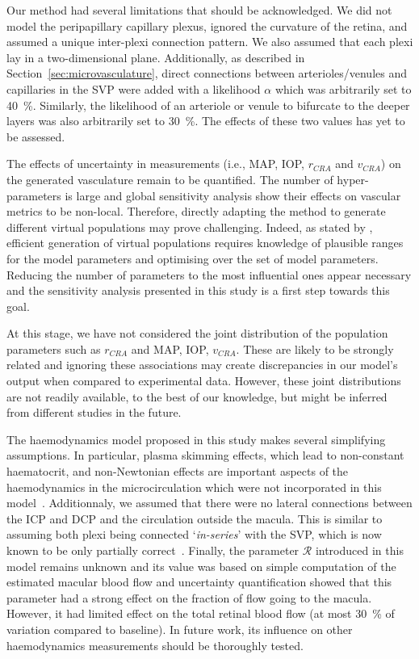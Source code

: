 \documentclass[11pt,]{article}
\begin{document}
Our method had several limitations that should be acknowledged.
We did not model the peripapillary capillary plexus, ignored the curvature of the retina, and assumed a unique inter-plexi connection pattern.
We also assumed that each plexi lay in a two-dimensional plane.
Additionally, as described in Section~\ref{sec:microvasculature}, direct connections between arterioles/venules and capillaries in the SVP were added with a likelihood $\alpha$ which was arbitrarily set to \SI{40}{\percent}.
Similarly, the likelihood of an arteriole or venule to bifurcate to the deeper layers was also arbitrarily set to \SI{30}{\percent}.
The effects of these two values has yet to be assessed.

The effects of uncertainty in measurements (i.e., MAP, IOP, $r_{CRA}$ and $v_{CRA}$) on the generated vasculature remain to be quantified.
The number of hyper-parameters is large and global sensitivity analysis show their effects on vascular metrics to be non-local.
Therefore, directly adapting the method to generate different virtual populations may prove challenging.
Indeed, as stated by \citet{Allen_2016}, efficient generation of virtual populations requires knowledge of plausible ranges for the model parameters and optimising over the set of model parameters.
Reducing the number of parameters to the most influential ones appear necessary and the sensitivity analysis presented in this study is a first step towards this goal.

At this stage, we have not considered the joint distribution of the population parameters such as $r_{CRA}$ and MAP, IOP, $v_{CRA}$.
These are likely to be strongly related and ignoring these associations may create discrepancies in our model's output when compared to experimental data.
However, these joint distributions are not readily available, to the best of our knowledge, but might be inferred from different studies in the future.

The haemodynamics model proposed in this study makes several simplifying assumptions.
In particular, plasma skimming effects, which lead to non-constant haematocrit, and non-Newtonian effects are important aspects of the haemodynamics in the microcirculation which were not incorporated in this model~\cite{Faahraeus1931,Secomb2013}.
Additionnaly, we assumed that there were no lateral connections between the ICP and DCP and the circulation outside the macula.
This is similar to assuming both plexi being connected `\textit{in-series}' with the SVP, which is now known to be only partially correct~\cite{An2020}.
Finally, the parameter $\mathcal R$ introduced in this model remains unknown and its value was based on simple computation of the estimated macular blood flow and uncertainty quantification showed that this parameter had a strong effect on the fraction of flow going to the macula.
However, it had limited effect on the total retinal blood flow (at most \SI{30}{\percent} of variation compared to baseline).
In future work, its influence on other haemodynamics measurements should be thoroughly tested.
\end{document}
